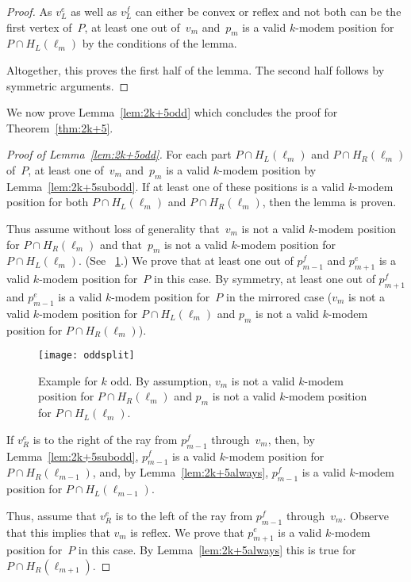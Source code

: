 \documentclass[A4]{article}
\begin{document}
\begin{proof}
As $v^e_L$ as well as $v^f_L$ can either be convex or reflex and not both can be the first vertex of~$P$, at least one out of~$v_m$ and~$p_m$ is a valid \mbox{$k$-modem} position for~$P\cap H_L(\ell_{m})$ by the conditions of the lemma.


\smallskip

Altogether, this proves the first half of the lemma. The second half follows by symmetric arguments.  
\end{proof}

We now prove Lemma~\ref{lem:2k+5odd} which concludes the proof for Theorem~\ref{thm:2k+5}.

\begin{proof}[Proof of Lemma~\ref{lem:2k+5odd}]
For each part $P\cap H_L(\ell_{m})$ and $P\cap H_R(\ell_{m})$ of~$P$, at least one of~$v_m$ and~$p_m$ is a valid \mbox{$k$-modem} position by Lemma~\ref{lem:2k+5subodd}.
If at least one of these positions is a valid \mbox{$k$-modem} position for both $P\cap H_L(\ell_{m})$ and $P\cap H_R(\ell_{m})$, then the lemma is proven.

Thus assume without loss of generality that~$v_m$ is not a valid \mbox{$k$-modem} position for $P\cap H_R(\ell_{m})$ and that~$p_m$ is not a valid \mbox{$k$-modem} position for $P\cap H_L(\ell_{m})$.
(See \figurename~\ref{fig:oddsplit}.) 
We prove that at least one out of $p^f_{m-1}$ and $p^e_{m+1}$ is a valid \mbox{$k$-modem} position for~$P$ in this case.
By symmetry, at least one out of $p^f_{m+1}$ and $p^e_{m-1}$ is a valid \mbox{$k$-modem} position for~$P$ in the mirrored case ($v_m$ is not a valid \mbox{$k$-modem} position for $P\cap H_L(\ell_{m})$ and $p_m$ is not a valid \mbox{$k$-modem} position for $P\cap H_R(\ell_{m})$).


\begin{figure}[htb]
  \centering
  \texttt{[image: oddsplit]}
  \caption{Example for $k$ odd. By assumption, $v_m$ is not a valid \mbox{$k$-modem} position for $P\cap H_R(\ell_{m})$ and $p_m$ is not a valid \mbox{$k$-modem} position for $P\cap H_L(\ell_{m})$.}
  \label{fig:oddsplit}
\end{figure}


If $v^e_R$ is to the right of the ray from $p^f_{m-1}$ through~$v_m$, then, by Lemma~\ref{lem:2k+5subodd}, $p^f_{m-1}$ is a valid \mbox{$k$-modem} position for $P\cap H_R(\ell_{m-1})$, and, by Lemma~\ref{lem:2k+5always}, $p^f_{m-1}$ is a valid \mbox{$k$-modem} position for $P\cap H_L(\ell_{m-1})$.

Thus, assume that $v^e_R$ is to the left of the ray from $p^f_{m-1}$ through~$v_m$.
Observe that this implies that $v_m$ is reflex.
We prove that $p^e_{m+1}$ is a valid \mbox{$k$-modem} position for~$P$ in this case.
By Lemma~\ref{lem:2k+5always} this is true for $P\cap H_R(\ell_{m+1})$.


\end{proof}
\end{document}
